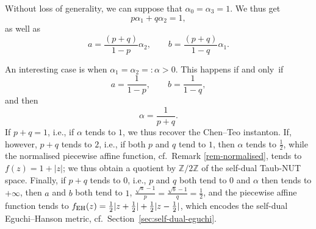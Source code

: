\documentclass[pdftex]{sigma}
\numberwithin{equation}{section}
\begin{document}
Without loss of generality, we can suppose that $\alpha _0 = \alpha _3 = 1$. We thus get
\[ p \alpha _1 + q \alpha _2 = 1, \]
as well as
\[%
 a = \frac{(p + q)}{1 - p} \alpha _2, \qquad b = \frac{(p + q)}{1 - q} \alpha _1. \]

 \begin{pc} \label{pc-AF1} An interesting case is when $\alpha _1 = \alpha _2 =: \alpha > 0$. This happens if and only~if
\[ a = \frac{1}{1 - p}, \qquad b = \frac{1}{1 - q}, \]
 and then
 \[ \alpha = \frac{1}{p + q}. \]
 If $p + q = 1$, i.e., if $\alpha$ tends to $1$, we thus recover the Chen--Teo instanton. If, however, $p + q$ tends to $2$, i.e., if both $p$ and $q$ tend to $1$, then $\alpha$ tends to $\frac{1}{2}$, while the normalised piecewise affine function, cf.\ Remark \ref{rem-normalised}, tends to $f (z) = 1 + |z|$; we thus obtain a quotient by $\mathbb{Z}/2 \mathbb{Z}$ of the self-dual Taub-NUT space.
Finally, if $p + q$ tends to $0$, i.e., $p$ and $q$ both tend to $0$ and $\alpha$ then tends to $+ \infty$, then $a$ and $b$ both tend to $1$, $\frac{\sqrt{a} - 1}{p} = \frac{\sqrt{b} - 1}{q} = \frac{1}{2}$, and the piecewise affine function tends to $f_{\rm EH} (z) = \frac{1}{2} |z + \frac{1}{2}| + \frac{1}{2} |z - \frac{1}{2}|$, which encodes the self-dual Eguchi--Hanson metric, cf.~Section~\ref{sec:self-dual-eguchi}.
\end{pc}
\end{document}
